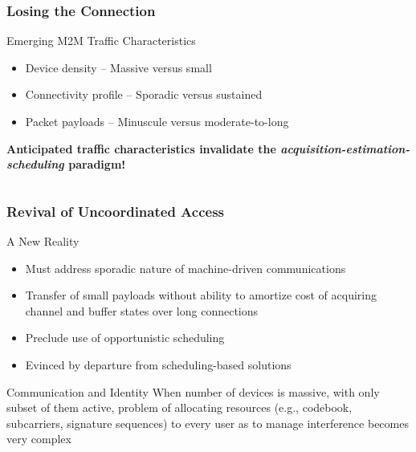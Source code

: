 \documentclass[10pt]{beamer}
\begin{document}
\begin{frame}
\frametitle{Losing the Connection}
\begin{block}{Emerging M2M Traffic Characteristics}
  \begin{itemize}
  \item Device density -- Massive versus small
  \item Connectivity profile -- Sporadic versus sustained
  \item Packet payloads -- Minuscule versus moderate-to-long
  \end{itemize}
\end{block}
\begin{center}
\textbf{Anticipated traffic characteristics invalidate the \emph{acquisition-estimation-scheduling} paradigm!}
\end{center}
\begin{columns}
  \begin{center}
  \scalebox{0.4}{}
  \end{center}
  \begin{center}
  \scalebox{0.4}{}
  \end{center}
\end{columns}
\end{frame}


\begin{frame}
\frametitle{Revival of Uncoordinated Access}
\begin{block}{A New Reality}
  \begin{itemize}
  \item Must address sporadic nature of machine-driven communications
  \item Transfer of small payloads without ability to amortize cost of acquiring channel and buffer states over long connections
  \item Preclude use of opportunistic scheduling
  \item Evinced by departure from scheduling-based solutions
  \end{itemize}
\end{block}
\begin{block}{Communication and Identity}
  When number of devices is massive, with only subset of them active, problem of allocating resources (e.g., codebook, subcarriers, signature sequences) to every user as to manage interference becomes very complex
\end{block}
\begin{center}
\end{center}
\end{frame}
\end{document}
